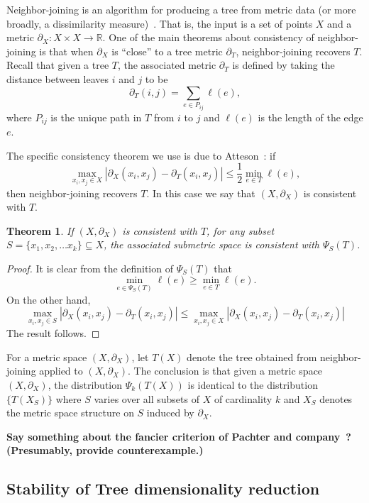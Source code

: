 \documentclass[a4paper,11pt]{article}
\newtheorem{theorem}{Theorem}
\begin{document}
Neighbor-joining is an algorithm for producing a tree from metric data (or more broadly, a dissimilarity measure)~\cite{}.
That is, the input is a set of points $X$ and a metric $\partial_X \colon X \times X \to \mathbb{R}$.
One of the main theorems about consistency of neighbor-joining is that when $\partial_X$ is ``close'' to a tree metric $\partial_T$, neighbor-joining recovers $T$.
Recall that given a tree $T$, the associated metric $\partial_T$ is defined by taking the distance between leaves $i$ and $j$ to be 
\[
\partial_T(i,j) = \sum_{e \in P_{ij}} \ell(e),
\]
where $P_{ij}$ is the unique path in $T$ from $i$ to $j$ and $\ell(e)$ is the length of the edge $e$.

The specific consistency theorem we use is due to Atteson~\cite{}: if
\[
\max_{x_i,x_j \in X} |\partial_X(x_i,x_j) - \partial_T(x_i,x_j)| \leq \frac{1}{2} \min_{e \in T} \ell(e),
\]
then neighbor-joining recovers $T$.  
In this case we say that $(X, \partial_X)$ is consistent with $T$.

\begin{theorem}
If $(X,\partial_X)$ is consistent with $T$, for any subset $S = \{x_1, x_2, \ldots x_k\} \subseteq X$, the associated submetric space is consistent with $\Psi_S(T)$.
\end{theorem}

\begin{proof}
It is clear from the definition of $\Psi_S(T)$ that 
\[
\min_{e \in \Psi_S(T)} \ell(e) \geq \min_{e \in T} \ell(e).
\]
On the other hand, 
\[
\max_{x_i,x_j \in S} |\partial_X(x_i,x_j) - \partial_T(x_i,x_j)| \leq
\max_{x_i,x_j \in X} |\partial_X(x_i,x_j) - \partial_T(x_i,x_j)| 
\]
The result follows.
\end{proof}

For a metric space $(X,\partial_X)$, let $T(X)$ denote the tree obtained from neighbor-joining applied to $(X,\partial_X)$.
The conclusion is that given a metric space $(X, \partial_X)$, the distribution $\Psi_k(T(X))$ is identical to the distribution $\{T(X_S)\}$ where $S$ varies over all subsets of $X$ of cardinality $k$ and $X_S$ denotes the metric space structure on $S$ induced by $\partial_X$.

{\bf Say something about the fancier criterion of Pachter and company~\cite{}?  (Presumably, provide counterexample.)}

\subsection{Stability of Tree dimensionality reduction}
\end{document}
